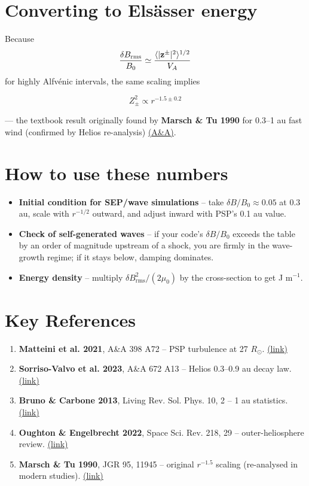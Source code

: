 \section*{Converting to \textbf{Elsässer energy}}

Because
\[
\frac{\delta B_{\mathrm{rms}}}{B_0} \simeq \frac{\langle |{\bf z}^{\pm}|^2 \rangle^{1/2}}{V_A}
\]
for highly Alfvénic intervals, the same scaling implies

\[
Z_\pm^2 \propto r^{-1.5\pm0.2}
\]

--- the textbook result originally found by \textbf{Marsch \& Tu 1990} for 0.3--1 au fast wind (confirmed by Helios re-analysis) \href{https://www.aanda.org/articles/aa/full_html/2025/01/aa51686-24/aa51686-24.html}{(A\&A)}.

\section*{How to use these numbers}

\begin{itemize}
\item \textbf{Initial condition for SEP/wave simulations} -- take $\delta B/B_0 \approx 0.05$ at 0.3 au, scale with $r^{-1/2}$ outward, and adjust inward with PSP’s 0.1 au value.
\item \textbf{Check of self-generated waves} -- if your code’s $\delta B/B_0$ exceeds the table by an order of magnitude upstream of a shock, you are firmly in the wave-growth regime; if it stays below, damping dominates.
\item \textbf{Energy density} -- multiply $\delta B_{\mathrm{rms}}^2 / (2\mu_0)$ by the cross-section to get J m$^{-1}$.
\end{itemize}

\section*{Key References}

\begin{enumerate}
\item \textbf{Matteini et al. 2021}, A\&A 398 A72 -- PSP turbulence at 27 $R_\odot$. \href{https://www.aanda.org/articles/aa/full_html/2021/06/aa39872-20/aa39872-20.html}{(link)}
\item \textbf{Sorriso-Valvo et al. 2023}, A\&A 672 A13 -- Helios 0.3--0.9 au decay law. \href{https://www.aanda.org/articles/aa/full_html/2023/04/aa44889-22/aa44889-22.html}{(link)}
\item \textbf{Bruno \& Carbone 2013}, Living Rev. Sol. Phys. 10, 2 -- 1 au statistics. \href{https://link.springer.com/article/10.12942/lrsp-2013-2}{(link)}
\item \textbf{Oughton \& Engelbrecht 2022}, Space Sci. Rev. 218, 29 -- outer-heliosphere review. \href{https://link.springer.com/article/10.1007/s11214-022-00914-2}{(link)}
\item \textbf{Marsch \& Tu 1990}, JGR 95, 11945 -- original $r^{-1.5}$ scaling (re-analysed in modern studies). \href{https://www.aanda.org/articles/aa/full_html/2025/01/aa51686-24/aa51686-24.html}{(link)}
\end{enumerate}

